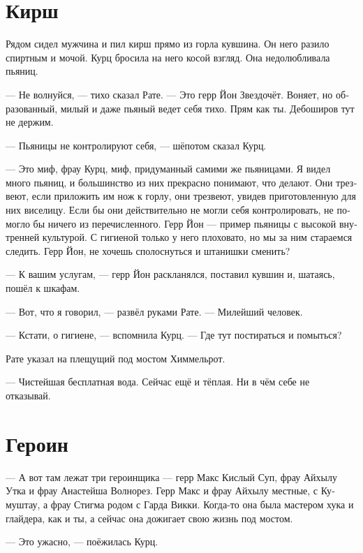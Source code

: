 \documentclass[a4paper,12pt,fleqn]{book}\usepackage{polyglossia}\setdefaultlanguage[babelshorthands=true]{russian}\setotherlanguage{english}\defaultfontfeatures{Ligatures=TeX,Mapping=tex-text}\usepackage{xcolor}\newcommand{\ml}[3]{#2}
\begin{document}
\section{Кирш}

Рядом сидел мужчина и пил кирш прямо из горла кувшина.
Он него разило спиртным и мочой.
Курц бросила на него косой взгляд.
Она недолюбливала пьяниц.

--- Не волнуйся, --- тихо сказал Рате.
--- Это герр Йон Звездочёт.
Воняет, но образованный, милый и даже пьяный ведет себя тихо.
Прям как ты.
Дебоширов тут не держим.

--- Пьяницы не контролируют себя, --- шёпотом сказал Курц.

--- Это миф, фрау Курц, миф, придуманный самими же пьяницами.
Я видел много пьяниц, и большинство из них прекрасно понимают, что делают.
Они трезвеют, если приложить им нож к горлу, они трезвеют, увидев приготовленную для них виселицу.
Если бы они действительно не могли себя контролировать, не помогло бы ничего из перечисленного.
Герр Йон --- пример пьяницы с высокой внутренней культурой.
С гигиеной только у него плоховато, но мы за ним стараемся следить.
Герр Йон, не хочешь сполоснуться и штанишки сменить?

--- К вашим услугам, --- герр Йон раскланялся, поставил кувшин и, шатаясь, пошёл к шкафам.

--- Вот, что я говорил, --- развёл руками Рате.
--- Милейший человек.

--- Кстати, о гигиене, --- вспомнила Курц.
--- Где тут постираться и помыться?

Рате указал на плещущий под мостом Химмельрот.

--- Чистейшая бесплатная вода.
Сейчас ещё и тёплая.
\ml{$0$}
{Ни в чём себе не отказывай.}
{Help yourself.''}

\section{Героин}

--- А вот там лежат три героинщика --- герр Макс Кислый Суп, фрау Айхылу Утка и фрау Анастейша Волнорез.
\ml{$0$}
{Герр Макс и фрау Айхылу местные, с Кумуштау, а фрау Стигма родом с Гарда Викки.}
{Herr Maks and frau \AE{}chylu are locals, from K\oe{}m\oe{}schtau, and frau Stigma is from Garda Wicca.}
Когда-то она была мастером хука и глайдера, как и ты, а сейчас она дожигает свою жизнь под мостом.

--- Это ужасно, --- поёжилась Курц.
\end{document}
